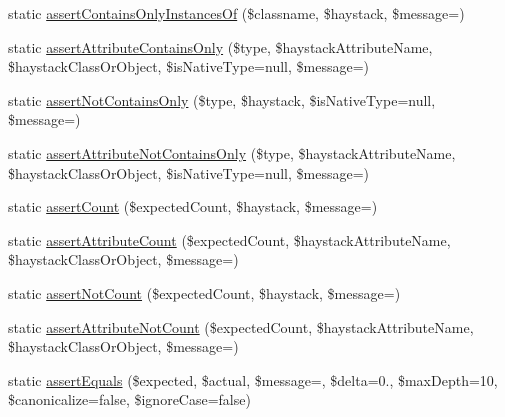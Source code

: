 \begin{DoxyCompactItemize}
\item 
static \mbox{\hyperlink{class_p_h_p_unit___framework___assert_a54bd7b2a67734284921a3fad4cdeef2f}{assert\+Contains\+Only\+Instances\+Of}} (\$classname, \$haystack, \$message=\textquotesingle{}\textquotesingle{})
\item 
static \mbox{\hyperlink{class_p_h_p_unit___framework___assert_ac93d4e19bc4a4827b553cbe7d9168fea}{assert\+Attribute\+Contains\+Only}} (\$type, \$haystack\+Attribute\+Name, \$haystack\+Class\+Or\+Object, \$is\+Native\+Type=null, \$message=\textquotesingle{}\textquotesingle{})
\item 
static \mbox{\hyperlink{class_p_h_p_unit___framework___assert_a73e6dd4f4b3a1dbb5782968ebc92e981}{assert\+Not\+Contains\+Only}} (\$type, \$haystack, \$is\+Native\+Type=null, \$message=\textquotesingle{}\textquotesingle{})
\item 
static \mbox{\hyperlink{class_p_h_p_unit___framework___assert_a8a154e30d659b731777e1e8ec697ad99}{assert\+Attribute\+Not\+Contains\+Only}} (\$type, \$haystack\+Attribute\+Name, \$haystack\+Class\+Or\+Object, \$is\+Native\+Type=null, \$message=\textquotesingle{}\textquotesingle{})
\item 
static \mbox{\hyperlink{class_p_h_p_unit___framework___assert_a53296d204ad17024a463664e6bd570cc}{assert\+Count}} (\$expected\+Count, \$haystack, \$message=\textquotesingle{}\textquotesingle{})
\item 
static \mbox{\hyperlink{class_p_h_p_unit___framework___assert_a13fb152a9b17fd4cd16864e07af97f19}{assert\+Attribute\+Count}} (\$expected\+Count, \$haystack\+Attribute\+Name, \$haystack\+Class\+Or\+Object, \$message=\textquotesingle{}\textquotesingle{})
\item 
static \mbox{\hyperlink{class_p_h_p_unit___framework___assert_af74304c3726d106f7b7f2441dfd35a09}{assert\+Not\+Count}} (\$expected\+Count, \$haystack, \$message=\textquotesingle{}\textquotesingle{})
\item 
static \mbox{\hyperlink{class_p_h_p_unit___framework___assert_ae2938f8363c37a10bcb44a1608045d81}{assert\+Attribute\+Not\+Count}} (\$expected\+Count, \$haystack\+Attribute\+Name, \$haystack\+Class\+Or\+Object, \$message=\textquotesingle{}\textquotesingle{})
\item 
static \mbox{\hyperlink{class_p_h_p_unit___framework___assert_a5ffdff2beb9b289f5f23752b6b5a33e6}{assert\+Equals}} (\$expected, \$actual, \$message=\textquotesingle{}\textquotesingle{}, \$delta=0., \$max\+Depth=10, \$canonicalize=false, \$ignore\+Case=false)
\item 

\end{DoxyCompactItemize}
